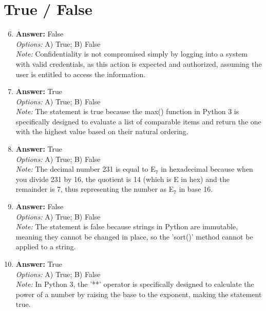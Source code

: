 \documentclass[12pt]{article}
\begin{document}
\section*{True / False}
\begin{enumerate}[label=\arabic*.]
\setcounter{enumi}{5}
\item \textbf{Answer:} False
\\ \textit{Options:} A) True; B) False
\\ \textit{Note:} Confidentiality is not compromised simply by logging into a system with valid credentials, as this action is expected and authorized, assuming the user is entitled to access the information.
\item \textbf{Answer:} True
\\ \textit{Options:} A) True; B) False
\\ \textit{Note:} The statement is true because the max() function in Python 3 is specifically designed to evaluate a list of comparable items and return the one with the highest value based on their natural ordering.
\item \textbf{Answer:} True
\\ \textit{Options:} A) True; B) False
\\ \textit{Note:} The decimal number 231 is equal to E$_{7}$ in hexadecimal because when you divide 231 by 16, the quotient is 14 (which is E in hex) and the remainder is 7, thus representing the number as E$_{7}$ in base 16.
\item \textbf{Answer:} False
\\ \textit{Options:} A) True; B) False
\\ \textit{Note:} The statement is false because strings in Python are immutable, meaning they cannot be changed in place, so the 'sort()' method cannot be applied to a string.
\item \textbf{Answer:} True
\\ \textit{Options:} A) True; B) False
\\ \textit{Note:} In Python 3, the '**' operator is specifically designed to calculate the power of a number by raising the base to the exponent, making the statement true.
\end{enumerate}
\end{document}
